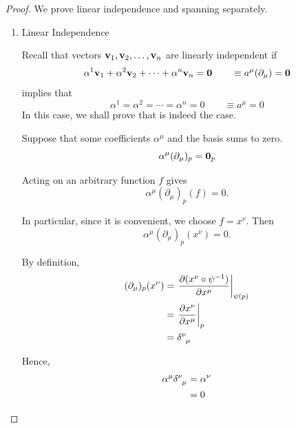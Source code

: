 		\begin{proof}
			We prove linear independence and spanning separately.
			\begin{enumerate}[(1)]
				\item Linear Independence
					
					Recall that vectors $\vb{v}_1, \vb{v}_2,\ldots,\vb{v}_n$ are linearly 
					independent if 
					\[
						\alpha^1 \vb{v}_1 + \alpha^2 \vb{v}_2 + \cdots + \alpha^n \vb{v}_n = \vb{0} \qquad\equiv a^\mu(\partial_\mu) = \vb{0}
					\]
					implies that
					\[
						\alpha^1=\alpha^2=\cdots=\alpha^n = 0 \qquad \equiv a^\mu = 0
					\]
					In this case, we shall prove that is indeed the case. 

					Suppose that some coefficients $\alpha^\mu$ and the basis sums to zero.
					\begin{equation}
						\alpha^\mu(\partial_\mu)_p
						=
						\vb{0}_p
						\label{eq:basis-linear-independence-assumption}
					\end{equation}

					Acting on an arbitrary function $f$ gives
					\begin{equation}
						\alpha^\mu(\partial_\mu)_p(f)
						=
						0.
						\label{eq:basis-linear-independence-action}
					\end{equation}

					In particular, since it is convenient, we choose $f=x^\nu$. Then
					\begin{equation}
						\alpha^\mu(\partial_\mu)_p(x^\nu)=0.
						\label{eq:basis-linear-independence-coordinate}
					\end{equation}

					By definition,
					\begin{align}
						(\partial_\mu)_p(x^\nu)
						&=
						\eval{
							\pdv{
								(x^\nu\circ\psi^{-1})
							}{x^\mu}
						}_{\psi(p)}
						\nonumber\\
						&=
						\eval{
							\pdv{x^\nu}{x^\mu}
						}_{p}
						\nonumber\\
						&=
						\tensor{\delta}{^\nu_\mu}
						\label{eq:coordinate-basis-delta}
					\end{align}

					Hence,
					\begin{align}
						\alpha^\mu\tensor{\delta}{^\nu_\mu}
						&=
						\alpha^\nu\\
						\nonumber
						&=
						0
						\label{eq:basis-alpha-zero}
					\end{align}


\end{enumerate}
\end{proof}
